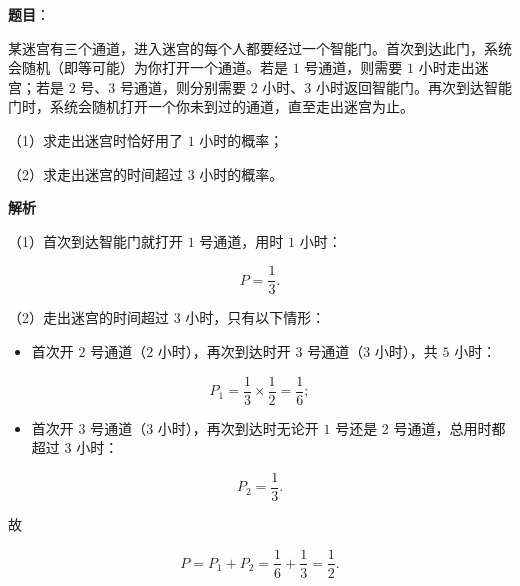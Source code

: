 \begin{answer}

\textbf{题目}：

某迷宫有三个通道，进入迷宫的每个人都要经过一个智能门。首次到达此门，系统会随机（即等可能）为你打开一个通道。若是 $1$ 号通道，则需要 $1$ 小时走出迷宫；若是 $2$ 号、$3$ 号通道，则分别需要 $2$ 小时、$3$ 小时返回智能门。再次到达智能门时，系统会随机打开一个你未到过的通道，直至走出迷宫为止。

（1）求走出迷宫时恰好用了 $1$ 小时的概率；

（2）求走出迷宫的时间超过 $3$ 小时的概率。

\textbf{解析}

（1）首次到达智能门就打开 $1$ 号通道，用时 $1$ 小时：

\nopagebreak[4]
\[P=\frac13.\]

（2）走出迷宫的时间超过 $3$ 小时，只有以下情形：

\begin{itemize}
\item 首次开 $2$ 号通道（$2$ 小时），再次到达时开 $3$ 号通道（$3$ 小时），共 $5$ 小时：
\end{itemize}

\nopagebreak[4]
\[P_1=\frac13\times\frac12=\frac16;\]

\begin{itemize}
\item 首次开 $3$ 号通道（$3$ 小时），再次到达时无论开 $1$ 号还是 $2$ 号通道，总用时都超过 $3$ 小时：
\end{itemize}

\nopagebreak[4]
\[P_2=\frac13.\]

故

\nopagebreak[4]
\[P=P_1+P_2=\frac16+\frac13=\frac12.\]


\end{answer}
